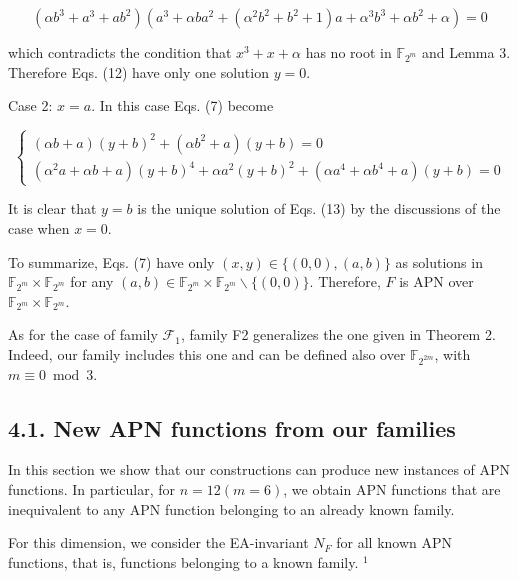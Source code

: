 \documentclass[10pt]{article}
\begin{document}
$$
\left(\alpha b^{3}+a^{3}+a b^{2}\right)\left(a^{3}+\alpha b a^{2}+\left(\alpha^{2} b^{2}+b^{2}+1\right) a+\alpha^{3} b^{3}+\alpha b^{2}+\alpha\right)=0
$$

which contradicts the condition that $x^{3}+x+\alpha$ has no root in $\mathbb{F}_{2^{m}}$ and Lemma 3. Therefore Eqs. (12) have only one solution $y=0$.

Case 2: $x=a$. In this case Eqs. (7) become

\[
\left\{\begin{array}{l}
(\alpha b+a)(y+b)^{2}+\left(\alpha b^{2}+a\right)(y+b)=0  \tag{13.1}\\
\left(\alpha^{2} a+\alpha b+a\right)(y+b)^{4}+\alpha a^{2}(y+b)^{2}+\left(\alpha a^{4}+\alpha b^{4}+a\right)(y+b)=0
\end{array}\right.
\]

It is clear that $y=b$ is the unique solution of Eqs. (13) by the discussions of the case when $x=0$.

To summarize, Eqs. (7) have only $(x, y) \in\{(0,0),(a, b)\}$ as solutions in $\mathbb{F}_{2^{m}} \times \mathbb{F}_{2^{m}}$ for any $(a, b) \in \mathbb{F}_{2^{m}} \times \mathbb{F}_{2^{m}} \backslash\{(0,0)\}$. Therefore, $F$ is APN over $\mathbb{F}_{2^{m}} \times \mathbb{F}_{2^{m}}$.

As for the case of family $\mathcal{F}_{1}$, family F2 generalizes the one given in Theorem 2. Indeed, our family includes this one and can be defined also over $\mathbb{F}_{2^{2 m}}$, with $m \equiv 0 \bmod 3$.

\subsection*{4.1. New APN functions from our families}
In this section we show that our constructions can produce new instances of APN functions. In particular, for $n=12(m=6)$, we obtain APN functions that are inequivalent to any APN function belonging to an already known family.

For this dimension, we consider the EA-invariant $N_{F}$ for all known APN functions, that is, functions belonging to a known family. ${ }^{1}$
\end{document}
